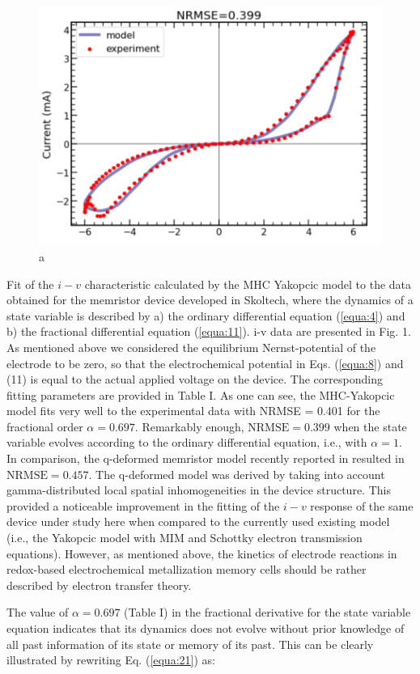 \documentclass[10pt]{article}
\begin{document}
\begin{multicols}{2}
{\begin{figure}[b]
    \includegraphics[scale=1]{latex_figure_a.png}
    \caption{a}
    \label{fig:my_label}
\end{figure}
Fit of the $i-v$ characteristic calculated by the MHC Yakopcic model to the data obtained for the memristor device developed in Skoltech, where the dynamics of a state variable is described by a) the ordinary differential equation (\ref{equa:4}) and b) the fractional differential equation (\ref{equa:11}).
i-v data are presented in Fig. 1. As mentioned above we considered the equilibrium Nernst-potential of the electrode to be zero, so that the electrochemical potential in Eqs. (\ref{equa:8}) and (11) is equal to the actual applied voltage on the device. The corresponding fitting parameters are provided in Table I. As one can see, the MHC-Yakopcic model fits very well to the experimental data with NRMSE = 0.401 for the fractional order $\alpha = 0.697$. Remarkably enough, $\text{NRMSE} = 0.399$ when the state variable evolves according to the ordinary differential equation, i.e., with $\alpha = 1$. In comparison, the q-deformed memristor model recently reported in resulted in $\text{NRMSE} = 0.457$. The q-deformed model was derived by taking into account gamma-distributed local spatial inhomogeneities in the device structure. This provided a noticeable improvement in the fitting of the $i-v$ response of the same device under study here when compared to the currently used existing model (i.e., the Yakopcic model with MIM and Schottky electron transmission equations). However, as mentioned above, the kinetics of electrode reactions in redox-based electrochemical metallization memory cells should be rather described by electron transfer theory. \par
The value of $\alpha = 0.697$ (Table I) in the fractional derivative for the state variable equation indicates that its dynamics does not evolve without prior knowledge of all past information of its state or memory of its past. This can be clearly illustrated by rewriting Eq. (\ref{equa:21}) as:
}
\end{multicols}
\end{document}
